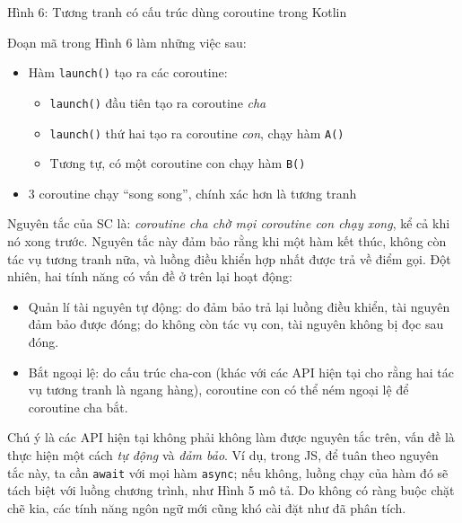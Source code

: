 Hình 6: Tương tranh có cấu trúc dùng coroutine trong Kotlin

Đoạn mã trong Hình 6 làm những việc sau:

\begin{itemize}
  \item
        Hàm \texttt{launch()} tạo ra các coroutine:

        \begin{itemize}
          
          \item
                \texttt{launch()} đầu tiên tạo ra coroutine \emph{cha}
          \item
                \texttt{launch()} thứ hai tạo ra coroutine \emph{con}, chạy hàm
                \texttt{A()}
          \item
                Tương tự, có một coroutine con chạy hàm \texttt{B()}
        \end{itemize}
  \item
        3 coroutine chạy ``song song'', chính xác hơn là tương tranh
\end{itemize}

Nguyên tắc của SC là: \emph{coroutine cha chờ mọi coroutine con chạy
  xong}, kể cả khi nó xong trước. Nguyên tắc này đảm bảo rằng khi một hàm
kết thúc, không còn tác vụ tương tranh nữa, và luồng điều khiển hợp nhất
được trả về điểm gọi. Đột nhiên, hai tính năng có vấn đề ở trên lại hoạt
động:

\begin{itemize}
  
  \item
        Quản lí tài nguyên tự động: do đảm bảo trả lại luồng điều khiển, tài
        nguyên đảm bảo được đóng; do không còn tác vụ con, tài nguyên không bị
        đọc sau đóng.
  \item
        Bắt ngoại lệ: do cấu trúc cha-con (khác với các API hiện tại cho rằng
        hai tác vụ tương tranh là ngang hàng), coroutine con có thể ném ngoại
        lệ để coroutine cha bắt.
\end{itemize}

Chú ý là các API hiện tại không phải không làm được nguyên tắc trên, vấn
đề là thực hiện một cách \emph{tự động} và \emph{đảm bảo}. Ví dụ, trong
JS, để tuân theo nguyên tắc này, ta cần \texttt{await} với mọi hàm
\texttt{async}; nếu không, luồng chạy của hàm đó sẽ tách biệt với luồng
chương trình, như Hình 5 mô tả. Do không có ràng buộc chặt chẽ kia, các
tính năng ngôn ngữ mới cũng khó cài đặt như đã phân tích.

